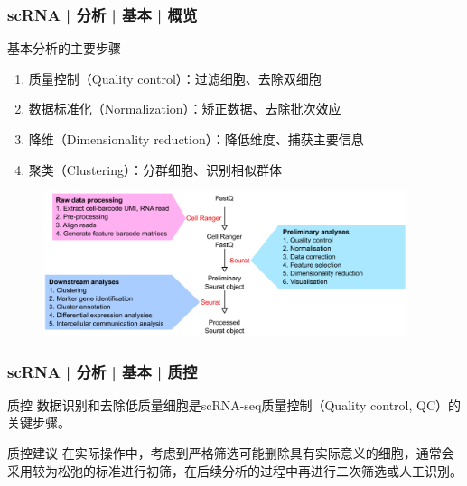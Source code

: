 \documentclass[11pt]{ctexbeamer}
\begin{document}
\begin{frame}
  \frametitle{scRNA | 分析 | 基本 | 概览}
  \begin{alertblock}{基本分析的主要步骤}
  	\begin{enumerate}
  	\item 质量控制（Quality control）：过滤细胞、去除双细胞
  	\item 数据标准化（Normalization）：矫正数据、去除批次效应
  	\item 降维（Dimensionality reduction）：降低维度、捕获主要信息
  	\item 聚类（Clustering）：分群细胞、识别相似群体
  \end{enumerate}
  \end{alertblock}
  \begin{figure}
  	\includegraphics[width=0.95\textwidth]{scRNA_basic_pipeline_01.png}
  \end{figure}
\end{frame}

\begin{frame}
  \frametitle{scRNA | 分析 | 基本 | 质控}
  \begin{block}{质控}
  	数据识别和去除低质量细胞是scRNA-seq质量控制（Quality control, QC）的关键步骤。
  	\end{block}
  \begin{block}{质控建议}
  	在实际操作中，考虑到严格筛选可能删除具有实际意义的细胞，通常会采用较为\alert{松弛的标准进行初筛}，在后续分析的过程中再进行二次筛选或人工识别。
  \end{block}
\end{frame}
\end{document}

